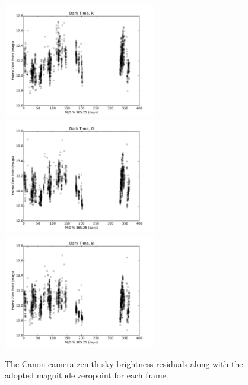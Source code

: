 \documentclass[]{spie}
\begin{document}
\begin{figure}
  \includegraphics[height=5cm]{plots/zpTOY_R.pdf}\includegraphics[height=5cm]{plots/zpTOY_G.pdf}\includegraphics[height=5cm]{plots/zpTOY_B.pdf}
  \caption{The Canon camera zenith sky brightness residuals along with the adopted magnitude zeropoint for each frame. \label{fig:timeOfYear}}
\end{figure}
\end{document}
